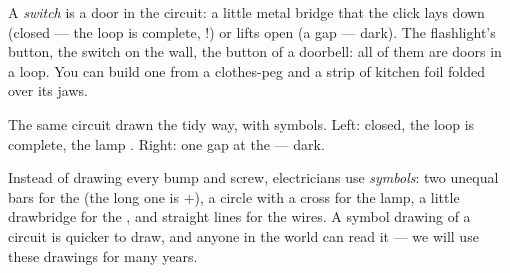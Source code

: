 \begin{example}\label{ex:g3:first-electric-circuit:switch}
A \emph{switch} is a door in the circuit: a little
metal bridge that the click lays down (closed --- the loop is
complete, !) or lifts open (a gap --- dark). The flashlight's
button, the  switch on the wall, the button of a doorbell: all
of them are doors in a loop. You can build one from a clothes-peg
and a strip of kitchen foil folded over its jaws.
\end{example}

\begin{omfigure}

{\small The same circuit drawn the tidy way, with symbols. Left:
 closed, the loop is complete, the lamp . Right: one
gap at the  --- dark.}
\end{omfigure}

\begin{remark}\label{rem:g3:first-electric-circuit:symbols}
Instead of drawing every  bump and  screw, electricians
use \emph{symbols}: two unequal bars for the  (the long one
is $+$), a circle with a cross for the lamp, a little drawbridge for
the , and straight lines for the wires. A symbol drawing of a
circuit is quicker to draw, and anyone in the world can read it ---
we will use these drawings for many years.
\end{remark}

